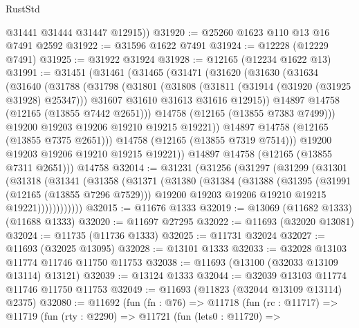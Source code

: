 \begin{lexlean}{RustStd}
\begin{coremodule}
        @31441
        @31444
        @31447
        @12915))
@31920 := @25260 @1623 @110 @13 @16 @7491 @2592
@31922 := @31596 @1622 @7491
@31924 := @12228 (@12229 @7491)
@31925 := @31922 @31924
@31928 := @12165 (@12234 @1622 @13)
@31991 := @31451
    (@31461
      (@31465
        (@31471
          (@31620
            (@31630
              (@31634
                (@31640
                  (@31788
                    (@31798
                      (@31801
                        (@31808
                          (@31811 (@31914 (@31920 (@31925 @31928) @25347)))
                          @31607
                          @31610
                          @31613
                          @31616
                          @12915))
                      @14897
                      @14758
                      (@12165 (@13855 @7442 @2651)))
                    @14758
                    (@12165 (@13855 @7383 @7499)))
                  @19200
                  @19203
                  @19206
                  @19210
                  @19215
                  @19221))
              @14897
              @14758
              (@12165 (@13855 @7375 @2651)))
            @14758
            (@12165 (@13855 @7319 @7514)))
          @19200
          @19203
          @19206
          @19210
          @19215
          @19221))
      @14897
      @14758
      (@12165 (@13855 @7311 @2651)))
    @14758
@32014 := @31231
    (@31256
      (@31297
        (@31299
          (@31301
            (@31318
              (@31341
                (@31358
                  (@31371
                    (@31380
                      (@31384
                        (@31388
                          (@31395
                            (@31991 (@12165 (@13855 @7296 @7529)))
                            @19200
                            @19203
                            @19206
                            @19210
                            @19215
                            @19221))))))))))))
@32015 := @11676 @1333
@32019 := @13069 (@11682 @1333) (@11688 @1333)
@32020 := @11697 @27295
@32022 := @11693 (@32020 @13081)
@32024 := @11735 (@11736 @1333)
@32025 := @11731 @32024
@32027 := @11693 (@32025 @13095)
@32028 := @13101 @1333
@32033 := @32028 @13103 @11774 @11746 @11750 @11753
@32038 := @11693 (@13100 (@32033 @13109 @13114) @13121)
@32039 := @13124 @1333
@32044 := @32039 @13103 @11774 @11746 @11750 @11753
@32049 := @11693 (@11823 (@32044 @13109 @13114) @2375)
@32080 := @11692
    (fun (fn : @76) =>
    @11718
      (fun (rc : @11717) =>
      @11719
        (fun (rty : @2290) =>
        @11721
          (fun (lets0 : @11720) =>

\end{coremodule}
\end{lexlean}
